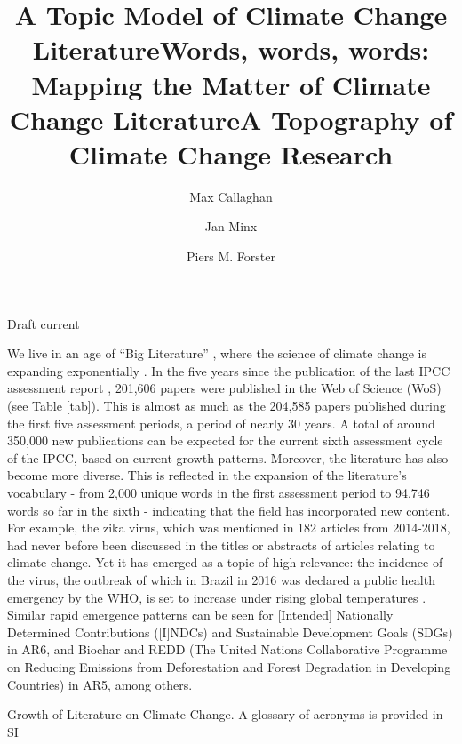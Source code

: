 \documentclass{article}
\title{A Topic Model of Climate Change Literature}
\title{Words, words, words: Mapping the Matter of Climate Change Literature}
\title{A Topography of Climate Change Research}
\author[1,2]{Max Callaghan}
\author[1,2]{Jan Minx}
\author[2]{Piers M. Forster}
\affil[1]{Mercator Research Institute on Global Commons and Climate Change, Torgauer Straße, 10829 Berlin, Germany}
\affil[2]{Priestley International Centre for Climate, University of Leeds, Leeds LS2 9JT, United Kingdom}
\makeatletter
\renewcommand{\maketitle}{\bgroup\setlength{\parindent}{0pt}
	\begin{flushleft}
		
		{\huge\textbf{\@title}}
		
		\bigskip
		
		{\large\textbf{\@author}}
		
		\bigskip
		
		{\large{Draft current \@date}}
		
	\end{flushleft}\egroup
}
\makeatother
\begin{document}
	\maketitle
	
	
	\begin{linenumbers}
		
		\noindent\textbf{}
		
		
		
		\bigskip
		
		\noindent We live in an age of ``Big Literature'' 
		\cite{Nunez-Mir2016, Minx2017l}, where the science of climate change is expanding exponentially \cite{Grieneisen2011, Haunschild2016}. In the five years since the publication of the last IPCC assessment report \cite{IPCC2014c}, 201,606 papers were published in the Web of Science (WoS) (see Table \ref{tab}). This is almost as much as the 204,585 papers published during the first five assessment periods, a period of nearly 30 years. A total of around 350,000 new publications can be expected for the current sixth assessment cycle of the IPCC, based on current growth patterns. Moreover, the literature has also become more diverse. This is reflected in the expansion of the literature's vocabulary - from 2,000 unique words in the first assessment period to 94,746 words so far in the sixth - indicating that the field has incorporated new content. For example, the zika virus, which was mentioned in 182 articles from 2014-2018, had never before been discussed in the titles or abstracts of articles relating to climate change. Yet it has emerged as a topic of high relevance: the incidence of the virus, the outbreak of which in Brazil in 2016 was declared a public health emergency by the WHO, is set to increase under rising global temperatures \cite{Rao2019}. Similar rapid emergence patterns can be seen for [Intended] Nationally Determined Contributions ([I]NDCs) and Sustainable Development Goals (SDGs) in AR6, and Biochar and REDD (The United Nations Collaborative Programme on Reducing Emissions from Deforestation and Forest Degradation in Developing Countries) in AR5, among others.
		
		
		\begin{table}[htp]
			{\scriptsize
				}
			\caption{Growth of Literature on Climate Change. A glossary of acronyms is provided in SI}
			\label{tab}
		\end{table}
		

\end{linenumbers}
\end{document}
